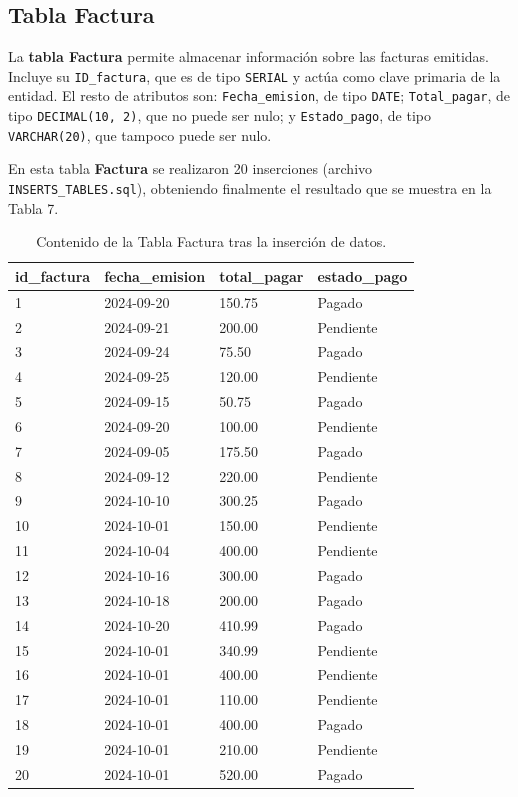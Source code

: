 \documentclass[spanish]{article}
\begin{document}
\subsection{Tabla Factura}

La \textbf{tabla Factura} permite almacenar información sobre las facturas emitidas. Incluye su \texttt{ID\_factura}, que es de tipo \texttt{SERIAL} y actúa como clave primaria de la entidad. El resto de atributos son: \texttt{Fecha\_emision}, de tipo \texttt{DATE}; \texttt{Total\_pagar}, de tipo \texttt{DECIMAL(10, 2)}, que no puede ser nulo; y \texttt{Estado\_pago}, de tipo \texttt{VARCHAR(20)}, que tampoco puede ser nulo.

En esta tabla \textbf{Factura} se realizaron 20 inserciones (archivo \texttt{INSERTS\_TABLES.sql}), obteniendo finalmente el resultado que se muestra en la Tabla 7.

\begin{table}[H]
\centering
\begin{tabular}{@{}|llll|@{}}
\toprule
\textbf{id\_factura} & \textbf{fecha\_emision} & \textbf{total\_pagar} & \textbf{estado\_pago} \\
\hline
1 & 2024-09-20 & 150.75 & Pagado \\ \hline
2 & 2024-09-21 & 200.00 & Pendiente \\ \hline
3 & 2024-09-24 & 75.50 & Pagado \\ \hline
4 & 2024-09-25 & 120.00 & Pendiente \\ \hline
5 & 2024-09-15 & 50.75 & Pagado \\ \hline
6 & 2024-09-20 & 100.00 & Pendiente \\ \hline
7 & 2024-09-05 & 175.50 & Pagado \\ \hline
8 & 2024-09-12 & 220.00 & Pendiente \\ \hline
9 & 2024-10-10 & 300.25 & Pagado \\ \hline
10 & 2024-10-01 & 150.00 & Pendiente \\ \hline
11 & 2024-10-04 & 400.00 & Pendiente \\ \hline
12 & 2024-10-16 & 300.00 & Pagado \\ \hline
13 & 2024-10-18 & 200.00 & Pagado \\ \hline
14 & 2024-10-20 & 410.99 & Pagado \\ \hline
15 & 2024-10-01 & 340.99 & Pendiente \\ \hline
16 & 2024-10-01 & 400.00 & Pendiente \\ \hline
17 & 2024-10-01 & 110.00 & Pendiente \\ \hline
18 & 2024-10-01 & 400.00 & Pagado \\ \hline
19 & 2024-10-01 & 210.00 & Pendiente \\ \hline
20 & 2024-10-01 & 520.00 & Pagado \\ \hline
\end{tabular}
\caption{Contenido de la Tabla Factura tras la inserción de datos.}
\label{tab:factura}
\end{table}
\end{document}
